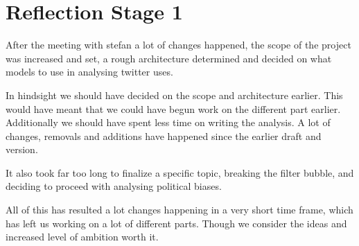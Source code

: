 \section{Reflection Stage 1}
After the meeting with stefan a lot of changes happened, the scope of the
project was increased and set, a rough architecture determined and decided on
what models to use in analysing twitter uses.\nl

In hindsight we should have decided on the scope and architecture earlier. This
would have meant that we could have begun work on the different part earlier.
Additionally we should have spent less time on writing the analysis. A lot of
changes, removals and additions have happened since the earlier draft and
version.\nl

It also took far too long to finalize a specific topic, breaking the
filter bubble, and deciding to proceed with analysing political biases.\nl

All of this has resulted a lot changes happening in a very short time frame,
which has left us working on a lot of different parts. Though we consider the
ideas and increased level of ambition worth it. 
